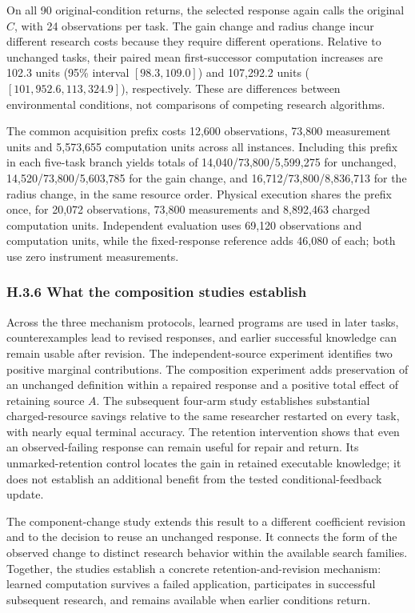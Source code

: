 \documentclass[11pt,a4paper]{article}
\begin{document}
On all 90 original-condition returns, the selected response again calls the original \(C\), with 24 observations per task. The gain change and radius change incur different research costs because they require different operations. Relative to unchanged tasks, their paired mean first-successor computation increases are 102.3 units (95\% interval \([98.3,109.0]\)) and 107,292.2 units (\([101{,}952.6,113{,}324.9]\)), respectively. These are differences between environmental conditions, not comparisons of competing research algorithms.


The common acquisition prefix costs 12,600 observations, 73,800 measurement units and 5,573,655 computation units across all instances. Including this prefix in each five-task branch yields totals of 14,040/73,800/5,599,275 for unchanged, 14,520/73,800/5,603,785 for the gain change, and 16,712/73,800/8,836,713 for the radius change, in the same resource order. Physical execution shares the prefix once, for 20,072 observations, 73,800 measurements and 8,892,463 charged computation units. Independent evaluation uses 69,120 observations and computation units, while the fixed-response reference adds 46,080 of each; both use zero instrument measurements.


\subsubsection*{H.3.6 What the composition studies establish}

Across the three mechanism protocols, learned programs are used in later tasks, counterexamples lead to revised responses, and earlier successful knowledge can remain usable after revision. The independent-source experiment identifies two positive marginal contributions. The composition experiment adds preservation of an unchanged definition within a repaired response and a positive total effect of retaining source \(A\). The subsequent four-arm study establishes substantial charged-resource savings relative to the same researcher restarted on every task, with nearly equal terminal accuracy. The retention intervention shows that even an observed-failing response can remain useful for repair and return. Its unmarked-retention control locates the gain in retained executable knowledge; it does not establish an additional benefit from the tested conditional-feedback update.


The component-change study extends this result to a different coefficient revision and to the decision to reuse an unchanged response. It connects the form of the observed change to distinct research behavior within the available search families. Together, the studies establish a concrete retention-and-revision mechanism: learned computation survives a failed application, participates in successful subsequent research, and remains available when earlier conditions return.
\end{document}
